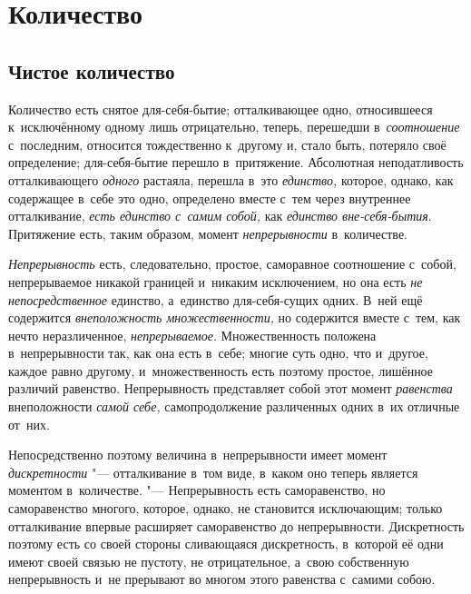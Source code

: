 \section{Количество}

\subsection{Чистое количество}

Количество есть снятое для-себя-бытие; отталкивающее одно, относившееся
к~исключённому одному лишь отрицательно, теперь, перешедши в~{\em соотношение}
с~последним, относится тождественно к~другому и, стало быть, потеряло своё
определение; для-себя-бытие перешло в~притяжение. Абсолютная неподатливость
отталкивающего {\em одного} растаяла, перешла в~это {\em единство,} которое,
однако, как содержащее в~себе это одно, определено вместе с~тем через
внутреннее отталкивание, {\em есть единство с~самим собой,} как
{\em единство вне-себя-бытия}. Притяжение есть, таким образом, момент
{\em непрерывности} в~количестве.

{\em Непрерывность} есть, следовательно, простое, саморавное соотношение
с~собой, непрерываемое никакой границей и~никаким исключением, но она есть
{\em не непосредственное} единство, а~единство для-себя-сущих одних. В~ней
ещё содержится {\em внеположность множественности,} но содержится вместе
с~тем, как нечто неразличенное, {\em непрерываемое}. Множественность положена
в~непрерывности так, как она есть в~себе; многие суть одно, что и~другое,
каждое равно другому, и~множественность есть поэтому простое, лишённое
различий равенство. Непрерывность представляет собой этот момент
{\em равенства} внеположности {\em самой себе,} самопродолжение различенных
одних в~их отличные от~них.

Непосредственно поэтому величина в~непрерывности имеет момент
{\em дискретности} "--- отталкивание в~том виде, в~каком оно теперь является
моментом в~количестве. "--- Непрерывность есть саморавенство, но саморавенство
многого, которое, однако, не становится исключающим; только отталкивание
впервые расширяет саморавенство до непрерывности. Дискретность поэтому есть
со своей стороны сливающаяся дискретность, в~которой её одни имеют своей связью
не пустоту, не отрицательное, а~свою собственную непрерывность и~не прерывают
во многом этого равенства с~самими собою.

